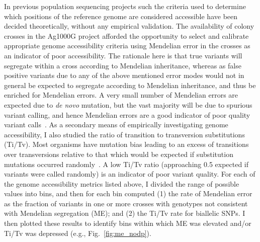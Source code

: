 \documentclass[a4paper,11pt,abstracton,hidelinks]{scrartcl}
\begin{document}
In previous population sequencing projects such \textcite{1000G2015} the criteria used to determine which positions of the reference genome are considered accessible have been decided theoretically, without any empirical validation.
%
The availability of colony crosses in the Ag1000G project afforded the opportunity to select and calibrate appropriate genome accessibility criteria using Mendelian error in the crosses as an indicator of poor accessibility.
%
The rationale here is that true variants will segregate within a cross according to Mendelian inheritance, whereas as false positive variants due to any of the above mentioned error modes would not in general be expected to segregate according to Mendelian inheritance, and thus be enriched for Mendelian errors.
%
A very small number of Mendelian errors are expected due to \textit{de novo} mutation, but the vast majority will be due to spurious variant calling, and hence Mendelian errors are a good indicator of poor quality variant calls~\parencite{Saunders2007,Laurie2010,Pilipenko2014}.
%
As a secondary means of empirically investigating genome accessibility, I also studied the ratio of transition to transversion substitutions (Ti/Tv).
%
Most organisms have mutation bias leading to an excess of transitions over transversions relative to that which would be expected if substitution mutations occurred randomly~\parencite{Guo2013}.
%
A low Ti/Tv ratio (approaching 0.5 expected if variants were called randomly) is an indicator of poor variant quality.
%
For each of the genome accessibility metrics listed above, I divided the range of possible values into bins, and then for each bin computed (1) the rate of Mendelian error as the fraction of variants in one or more crosses with genotypes not consistent with Mendelian segregation (ME); and (2) the Ti/Tv rate for biallelic SNPs.
%
I then plotted these results to identify bins within which ME was elevated and/or Ti/Tv was depressed (e.g., Fig.~\ref{fig:me_nodp}).
\end{document}
